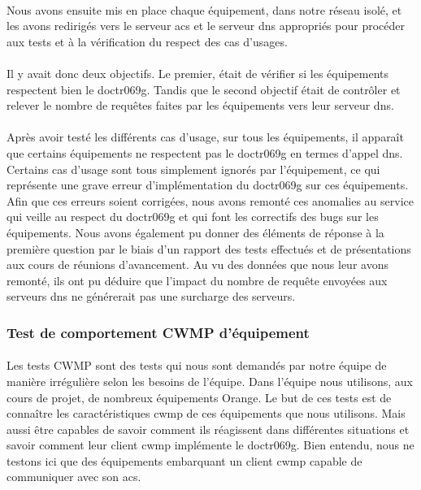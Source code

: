 \documentclass[12pt,a4paper]{report}
\begin{document}
\paragraph*{}Nous avons ensuite mis en place chaque équipement, dans notre réseau isolé, et les avons redirigés vers le serveur \gls{acs} et le serveur \gls{dns} appropriés pour procéder aux tests et à la vérification du respect des cas d’usages. 
\paragraph*{}Il y avait donc deux objectifs. Le premier, était de vérifier si les équipements respectent bien le \gls{doctr069g}. Tandis que le second objectif était de contrôler et relever le nombre de requêtes faites par les équipements vers leur serveur \gls{dns}. 
\paragraph*{}Après avoir testé les différents cas d’usage, sur tous les équipements, il apparaît que certains équipements ne respectent pas le \gls{doctr069g} en termes d'appel \gls{dns}. Certains cas d’usage sont tous simplement ignorés par l'équipement, ce qui représente une grave
erreur d'implémentation du \gls{doctr069g} sur ces équipements. Afin que ces erreurs soient corrigées, nous avons remonté ces anomalies au service qui veille au respect du \gls{doctr069g} et qui font les correctifs des bugs sur les équipements. Nous avons également pu donner des éléments de réponse à la première question par le biais d’un rapport des tests effectués et de présentations aux cours de réunions d'avancement. Au vu des données que nous leur avons remonté, ils ont pu déduire que l'impact du nombre de requête envoyées aux serveurs \gls{dns} ne générerait pas une surcharge des serveurs. \\
\subsubsection{Test de comportement CWMP d'équipement}
\paragraph*{}Les tests CWMP sont des tests qui nous sont demandés par notre équipe de manière irrégulière selon les besoins de l'équipe. Dans l’équipe nous utilisons, aux cours de projet, de nombreux équipements Orange. Le but de ces tests est de connaître les caractéristiques \gls{cwmp} de ces équipements que nous utilisons. Mais aussi être capables de savoir comment ils réagissent dans différentes situations et savoir comment leur client \gls{cwmp} implémente le \gls{doctr069g}. Bien entendu, nous ne testons ici que des équipements embarquant un client \gls{cwmp} capable de communiquer avec son \gls{acs}.
\end{document}
